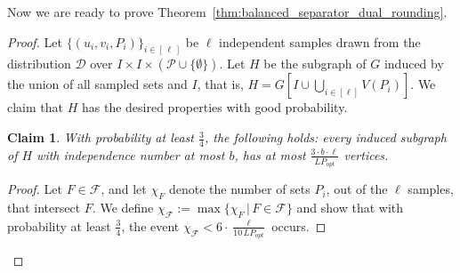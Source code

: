 \documentclass[11pt]{amsart}
\newtheorem{claim}{Claim}[theorem]
\newcommand{\lpopt}{LP_{opt}}
\begin{document}
Now we are ready to prove Theorem~\ref{thm:balanced_separator_dual_rounding}.

\BalancedSeparatorDualRounding*
\begin{proof}
    Let $\{(u_i, v_i, P_i)\}_{i\in[\,\ell\,]}$ be $\ell$ independent samples drawn from the distribution $\mathcal{D}$ over $I\times I\times (\mathcal{P} \cup \{\emptyset\})$. Let $H$ be the subgraph of $G$ induced by the union of all sampled sets and $I$, that is, $H = G[I\cup\bigcup_{i \in [\ell]} V(P_i)]$. We claim that $H$ has the desired properties with good probability.


    \begin{claim}\label{claim:small_clique}
        With probability at least $\frac{3}{4}$, the following holds: every induced subgraph of $H$ with independence number at most $b$, has at most $\frac{3 \cdot b \cdot \ell}{\lpopt}$ vertices.
    \end{claim}
    \begin{proof}
        Let $F \in \mathcal{F}$, and let $\chi_F$ denote the number of sets $P_i$, out of the $\ell$ samples, that intersect $F$. We define $\chi_{\mathcal{F}} := \max\{\chi_F\, |\, F\in\mathcal{F}\}$ and show that with probability at least $\frac{3}{4}$, the event $\chi_{\mathcal{F}} < 6 \cdot \frac{\ell}{10\,\lpopt}$ occurs. 
        

\end{proof}
\end{proof}
\end{document}
